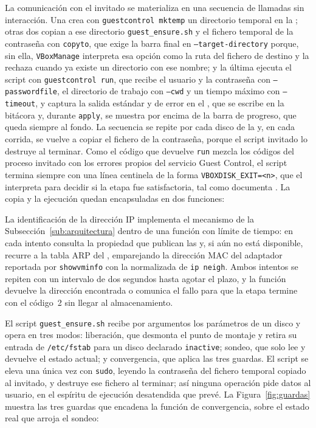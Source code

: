 La comunicación con el invitado se materializa en una secuencia de llamadas sin interacción. Una crea con \texttt{guestcontrol mktemp} un directorio temporal en la \vm{}; otras dos copian a ese directorio \texttt{guest\_ensure.sh} y el fichero temporal de la contraseña con \texttt{copyto}, que exige la barra final en \texttt{--target-directory} porque, sin ella, \texttt{VBoxManage} interpreta esa opción como la ruta del fichero de destino y la rechaza cuando ya existe un directorio con ese nombre; y la última ejecuta el script con \texttt{guestcontrol run}, que recibe el usuario y la contraseña con \texttt{--passwordfile}, el directorio de trabajo con \texttt{--cwd} y un tiempo máximo con \texttt{--timeout}, y captura la salida estándar y de error en el \host{}, que se escribe en la bitácora y, durante \texttt{apply}, se muestra por encima de la barra de progreso, que queda siempre al fondo. La secuencia se repite por cada disco de la \vm{} y, en cada corrida, se vuelve a copiar el fichero de la contraseña, porque el script invitado lo destruye al terminar. Como el código que devuelve \texttt{run} mezcla los códigos del proceso invitado con los errores propios del servicio Guest Control, el script termina siempre con una línea centinela de la forma \texttt{VBOXDISK\_EXIT=<n>}, que el \host{} interpreta para decidir si la etapa fue satisfactoria, tal como documenta \textcite{virtualbox_guestcontrol}. La copia y la ejecución quedan encapsuladas en dos funciones:



La identificación de la dirección IP implementa el mecanismo de la Subsección~\ref{sub:arquitectura} dentro de una función con límite de tiempo: en cada intento consulta la propiedad que publican las \guestadditions{} y, si aún no está disponible, recurre a la tabla ARP del \host{}, emparejando la dirección MAC del adaptador reportada por \texttt{showvminfo} con la normalizada de \texttt{ip neigh}. Ambos intentos se repiten con un intervalo de dos segundos hasta agotar el plazo, y la función devuelve la dirección encontrada o comunica el fallo para que la etapa termine con el código~2 sin llegar al almacenamiento.

El script \texttt{guest\_ensure.sh} recibe por argumentos los parámetros de un disco y opera en tres modos: liberación, que desmonta el punto de montaje y retira su entrada de \texttt{/etc/fstab} para un disco declarado \texttt{inactive}; sondeo, que solo lee y devuelve el estado actual; y convergencia, que aplica las tres guardas. El script se eleva una única vez con \texttt{sudo}, leyendo la contraseña del fichero temporal copiado al invitado, y destruye ese fichero al terminar; así ninguna operación pide datos al usuario, en el espíritu de ejecución desatendida que \textcite{virtualbox_guestcontrol} prevé. La Figura~\ref{fig:guardas} muestra las tres guardas que encadena la función de convergencia, sobre el estado real que arroja el sondeo:


